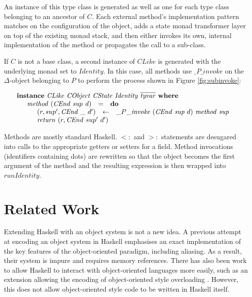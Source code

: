 \documentclass[runningheads,a4paper]{llncs}
\newcommand{\todo}[1]{[{\color{blue}#1}]}
\begin{document}
An instance of this type class is generated as well as one for each type class belonging to an ancestor of $C$. Each external method's implementation pattern matches on the configuration of the object, adds a state monad transformer layer on top of the existing monad stack, and then either invokes its own, internal implementation of the method or propagates the call to a sub-class.


If $C$ is not a base class, a second instance of $\mathit{CLike}$ is generated with the underlying monad set to $\mathit{Identity}$. In this case, all methods use $\_P\_\mathit{invoke}$ on the $\Delta$-object belonging to $P$ to perform the process shown in Figure \ref{fig:subinvoke}:

\begin{displaymath}
\begin{array}{l}
\mathbf{instance}~\mathit{CLike}~\mathit{CObject}~\mathit{CState}~\mathit{Identity}~\overline{\mathit{tyvar}}~\mathbf{where}\\
\quad \begin{array}{lcl}
\mathit{method}~(\mathit{CEnd}~\mathit{sup}~\mathit{d}) & = & \mathbf{do} \\
\multicolumn{3}{l}{\quad \begin{array}{lcl}
(r,sup',\mathit{CEnd}~\_~d') & \leftarrow & \_P\_\mathit{invoke}~(\mathit{CEnd}~\mathit{sup}~d)~\mathit{method}~\mathit{sup} \\
\multicolumn{3}{l}{\mathit{return}~(r, \mathit{CEnd}~sup'~d')}
\end{array}}
\end{array}
\end{array}
\end{displaymath}

Methods are mostly standard Haskell. $<:$ and $>:$ statements are desugared into calls to the appropriate getters or setters for a field. Method invocations (identifiers containing dots) are rewritten so that the object becomes the first argument of the method and the resulting expression is then wrapped into $\mathit{runIdentity}$.

\section{Related Work}
\label{sec:related}

Extending Haskell with an object system is not a new idea. A previous attempt at encoding an object system in Haskell \cite{OOHaskell} emphasises an exact implementation of the key features of the object-oriented paradigm, including aliasing. As a result, their system is impure and requires memory references. There has also been work to allow Haskell to interact with object-oriented languages more easily, such as an extension allowing the encoding of object-oriented style overloading \cite{shields2001object}. However, this does not allow object-oriented style code to be written in Haskell itself.
\end{document}
